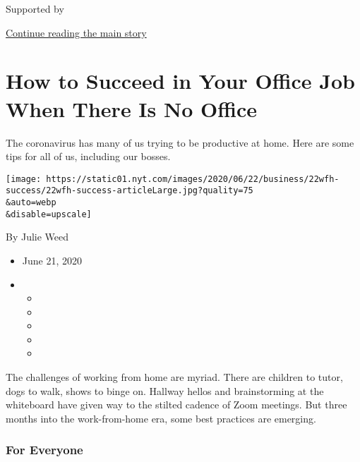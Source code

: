 Supported by

\protect\hyperlink{after-sponsor}{Continue reading the main story}

\hypertarget{how-to-succeed-in-your-office-job-when-there-is-no-office}{%
\section{How to Succeed in Your Office Job When There Is No
Office}\label{how-to-succeed-in-your-office-job-when-there-is-no-office}}

The coronavirus has many of us trying to be productive at home. Here are
some tips for all of us, including our bosses.

\texttt{[image: https://static01.nyt.com/images/2020/06/22/business/22wfh-success/22wfh-success-articleLarge.jpg?quality=75\\\&auto=webp\\\&disable=upscale]}

By Julie Weed

\begin{itemize}
\item
  June 21, 2020
\item
  \begin{itemize}
  \item
  \item
  \item
  \item
  \item
  \end{itemize}
\end{itemize}

The challenges of working from home are myriad. There are children to
tutor, dogs to walk, shows to binge on. Hallway hellos and brainstorming
at the whiteboard have given way to the stilted cadence of Zoom
meetings. But three months into the work-from-home era, some best
practices are emerging.

\hypertarget{for-everyone}{%
\subsubsection{\texorpdfstring{\textbf{For
Everyone}}{For Everyone}}\label{for-everyone}}

